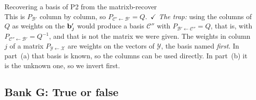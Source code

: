 \documentclass[11pt]{article}
\begin{document}
\begin{exmp}{Recovering a basis of P2 from the matrix}{b-recover}
\[\]
This is $P_{\mathcal{B}'}$ column by column, so $P_{\mathcal{C}'\leftarrow\mathcal{B}'}=Q$.\ $\checkmark$ \emph{The trap:} using the columns of $Q$ as weights on the $\mathbf{b}'_j$ would produce a basis $\mathcal{C}''$ with $P_{\mathcal{B}'\leftarrow\mathcal{C}''}=Q$, that is, with $P_{\mathcal{C}''\leftarrow\mathcal{B}'}=Q^{-1}$, and that is not the matrix we were given. The weights in column $j$ of a matrix $P_{\mathcal{Y}\leftarrow\mathcal{X}}$ are weights on the vectors of $\mathcal{Y}$, the basis named \emph{first}. In part~(a) that basis is known, so the columns can be used directly. In part~(b) it is the unknown one, so we invert first.
\end{exmp}

\subsection*{Bank G: True or false}
\end{document}
